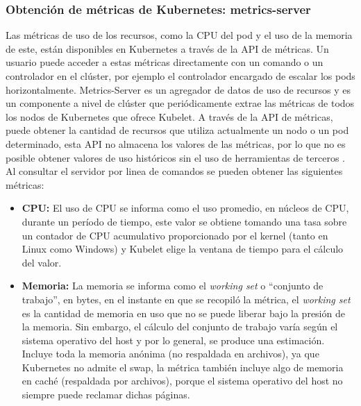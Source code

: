 \subsubsection{Obtenci\'on de m\'etricas de Kubernetes: metrics-server}

\par Las métricas de uso de los recursos, como la CPU del pod y el uso de la memoria de este, están disponibles en Kubernetes a través de la API de métricas. Un usuario puede acceder a estas métricas directamente con un comando o un controlador en el clúster, por ejemplo el controlador encargado de escalar los pods horizontalmente. Metrics-Server es un agregador de datos de uso de recursos y es un componente a nivel de clúster que periódicamente extrae las métricas de todos los nodos de Kubernetes que ofrece Kubelet. A través de la API de métricas, puede obtener la cantidad de recursos que utiliza actualmente un nodo o un pod determinado, esta API no almacena los valores de las métricas, por lo que no es posible obtener valores de uso históricos sin el uso de herramientas de terceros \cite{WEB03}. Al consultar el servidor por linea de comandos se pueden obtener las siguientes métricas: 
\begin{itemize}
    \item \textbf{CPU:} El uso de CPU se informa como el uso promedio, en núcleos de CPU, durante un período de tiempo, este valor se obtiene tomando una tasa sobre un contador de CPU acumulativo proporcionado por el kernel (tanto en Linux como Windows) y Kubelet elige la ventana de tiempo para el cálculo del valor.
    \item \textbf{Memoria:} La memoria se informa como el \textit{working set} o ``conjunto de trabajo'', en bytes, en el instante en que se recopiló la métrica, el \textit{working set} es la cantidad de memoria en uso que no se puede liberar bajo la presión de la memoria. Sin embargo, el cálculo del conjunto de trabajo varía según el sistema operativo del host y por lo general, se produce una estimación. Incluye toda la memoria anónima (no respaldada en archivos), ya que Kubernetes no admite el swap, la métrica también incluye algo de memoria en caché (respaldada por archivos), porque el sistema operativo del host no siempre puede reclamar dichas páginas.
\end{itemize}

